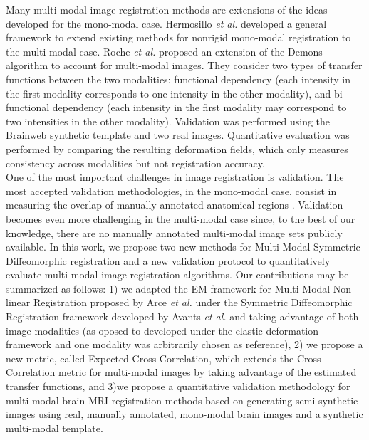 Many multi-modal image registration methods are extensions of the ideas developed for the mono-modal case. Hermosillo {\it et al.} \cite{Hermosillo2004} developed a general framework to extend existing methods for nonrigid mono-modal registration to the multi-modal case. Roche {\it et al.} \cite{Roche2004a} proposed an extension of the Demons algorithm to account for multi-modal images. They consider two types of transfer functions between the two modalities: functional dependency (each intensity in the first modality corresponds to one intensity in the other modality), and bi-functional dependency (each intensity in the first modality may correspond to two intensities in the other modality). Validation was performed using the Brainweb synthetic template \cite{Cocosco1997}\cite{Kwan1999} and two real images. Quantitative evaluation was performed by comparing
the resulting deformation fields, which only measures consistency across modalities but not registration accuracy.\\

One of the most important challenges in image registration is validation. The most accepted validation methodologies, in the mono-modal case, consist in measuring the overlap of manually annotated anatomical regions \cite{Klein2009}\cite{Klein2010}\cite{Rohlfing2012}. Validation becomes even more challenging in the multi-modal case since, to the best of our knowledge, there are no manually annotated multi-modal image sets publicly available. In this work, we propose two new methods for Multi-Modal Symmetric Diffeomorphic registration and a new validation protocol to quantitatively evaluate multi-modal image registration algorithms. Our contributions may be summarized as follows: 1) we adapted the EM framework for Multi-Modal Non-linear Registration proposed by Arce {\it et al.}\cite{Arce-santana2014} under the Symmetric Diffeomorphic Registration framework developed by Avants {\it et al.}\cite{Avants2008} \cite{Avants2011} and taking advantage of both image modalities (as oposed to \cite{Arce-santana2014} developed under the elastic deformation framework and one modality was arbitrarily chosen as reference), 2) we propose a new metric, called Expected Cross-Correlation, which extends the Cross-Correlation metric for multi-modal images by taking advantage of the estimated transfer functions, and 3)we propose a quantitative validation methodology for multi-modal brain MRI registration methods based on generating semi-synthetic images using real, manually annotated, mono-modal brain images and a synthetic multi-modal template.\\
